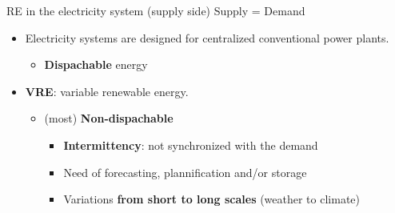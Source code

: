 \documentclass{beamer}%
\begin{document}
\begin{frame}{RE in the electricity system (supply side)}
\centering\Large {Supply = Demand}
\small{  \begin{itemize}  
  \item Electricity systems are designed for centralized \alert{conventional power plants}.
    \begin{itemize}
    \item \textbf{Dispachable} energy
    \end{itemize}
  \item \textbf{\alert{VRE}}: variable renewable energy.
    \begin{itemize}
    \item (most) \textbf{Non-dispachable}
      \begin{itemize}
         \item \textbf{\alert{Intermittency}}: not synchronized with the demand
         \item Need of forecasting, plannification and/or storage
         \item Variations \textbf{from short to long scales} (weather to climate)
  \end{itemize}
  \end{itemize}  
  \end{itemize}}
\end{frame}
\end{document}
